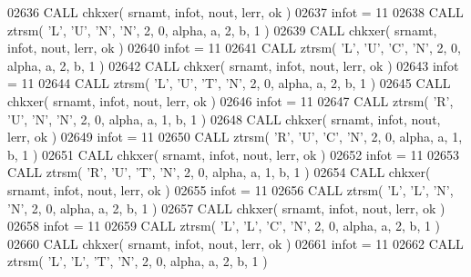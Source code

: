 \begin{DoxyCode}
02636       \textcolor{keyword}{CALL }chkxer( srnamt, infot, nout, lerr, ok )
02637       infot = 11
02638       \textcolor{keyword}{CALL }ztrsm( \textcolor{stringliteral}{'L'}, \textcolor{stringliteral}{'U'}, \textcolor{stringliteral}{'N'}, \textcolor{stringliteral}{'N'}, 2, 0, alpha, a, 2, b, 1 )
02639       \textcolor{keyword}{CALL }chkxer( srnamt, infot, nout, lerr, ok )
02640       infot = 11
02641       \textcolor{keyword}{CALL }ztrsm( \textcolor{stringliteral}{'L'}, \textcolor{stringliteral}{'U'}, \textcolor{stringliteral}{'C'}, \textcolor{stringliteral}{'N'}, 2, 0, alpha, a, 2, b, 1 )
02642       \textcolor{keyword}{CALL }chkxer( srnamt, infot, nout, lerr, ok )
02643       infot = 11
02644       \textcolor{keyword}{CALL }ztrsm( \textcolor{stringliteral}{'L'}, \textcolor{stringliteral}{'U'}, \textcolor{stringliteral}{'T'}, \textcolor{stringliteral}{'N'}, 2, 0, alpha, a, 2, b, 1 )
02645       \textcolor{keyword}{CALL }chkxer( srnamt, infot, nout, lerr, ok )
02646       infot = 11
02647       \textcolor{keyword}{CALL }ztrsm( \textcolor{stringliteral}{'R'}, \textcolor{stringliteral}{'U'}, \textcolor{stringliteral}{'N'}, \textcolor{stringliteral}{'N'}, 2, 0, alpha, a, 1, b, 1 )
02648       \textcolor{keyword}{CALL }chkxer( srnamt, infot, nout, lerr, ok )
02649       infot = 11
02650       \textcolor{keyword}{CALL }ztrsm( \textcolor{stringliteral}{'R'}, \textcolor{stringliteral}{'U'}, \textcolor{stringliteral}{'C'}, \textcolor{stringliteral}{'N'}, 2, 0, alpha, a, 1, b, 1 )
02651       \textcolor{keyword}{CALL }chkxer( srnamt, infot, nout, lerr, ok )
02652       infot = 11
02653       \textcolor{keyword}{CALL }ztrsm( \textcolor{stringliteral}{'R'}, \textcolor{stringliteral}{'U'}, \textcolor{stringliteral}{'T'}, \textcolor{stringliteral}{'N'}, 2, 0, alpha, a, 1, b, 1 )
02654       \textcolor{keyword}{CALL }chkxer( srnamt, infot, nout, lerr, ok )
02655       infot = 11
02656       \textcolor{keyword}{CALL }ztrsm( \textcolor{stringliteral}{'L'}, \textcolor{stringliteral}{'L'}, \textcolor{stringliteral}{'N'}, \textcolor{stringliteral}{'N'}, 2, 0, alpha, a, 2, b, 1 )
02657       \textcolor{keyword}{CALL }chkxer( srnamt, infot, nout, lerr, ok )
02658       infot = 11
02659       \textcolor{keyword}{CALL }ztrsm( \textcolor{stringliteral}{'L'}, \textcolor{stringliteral}{'L'}, \textcolor{stringliteral}{'C'}, \textcolor{stringliteral}{'N'}, 2, 0, alpha, a, 2, b, 1 )
02660       \textcolor{keyword}{CALL }chkxer( srnamt, infot, nout, lerr, ok )
02661       infot = 11
02662       \textcolor{keyword}{CALL }ztrsm( \textcolor{stringliteral}{'L'}, \textcolor{stringliteral}{'L'}, \textcolor{stringliteral}{'T'}, \textcolor{stringliteral}{'N'}, 2, 0, alpha, a, 2, b, 1 )

\end{DoxyCode}
